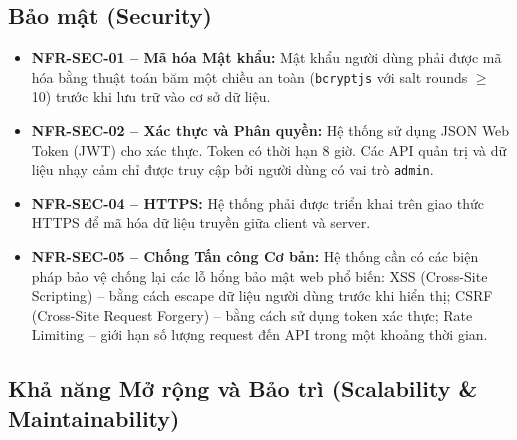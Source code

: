 \subsection{Bảo mật (Security)}

\begin{itemize}
    \item \textbf{NFR-SEC-01 – Mã hóa Mật khẩu:} Mật khẩu người dùng phải được mã hóa bằng thuật toán băm một chiều an toàn (\texttt{bcryptjs} với salt rounds $\geq$ 10) trước khi lưu trữ vào cơ sở dữ liệu.
    
    \item \textbf{NFR-SEC-02 – Xác thực và Phân quyền:} Hệ thống sử dụng JSON Web Token (JWT) cho xác thực. Token có thời hạn 8 giờ. Các API quản trị và dữ liệu nhạy cảm chỉ được truy cập bởi người dùng có vai trò \texttt{admin}.
    
    \item \textbf{NFR-SEC-04 – HTTPS:} Hệ thống phải được triển khai trên giao thức HTTPS để mã hóa dữ liệu truyền giữa client và server.
    
    \item \textbf{NFR-SEC-05 – Chống Tấn công Cơ bản:} Hệ thống cần có các biện pháp bảo vệ chống lại các lỗ hổng bảo mật web phổ biến: XSS (Cross-Site Scripting) – bằng cách escape dữ liệu người dùng trước khi hiển thị; CSRF (Cross-Site Request Forgery) – bằng cách sử dụng token xác thực; Rate Limiting – giới hạn số lượng request đến API trong một khoảng thời gian.
\end{itemize}

\subsection{Khả năng Mở rộng và Bảo trì (Scalability \& Maintainability)}

